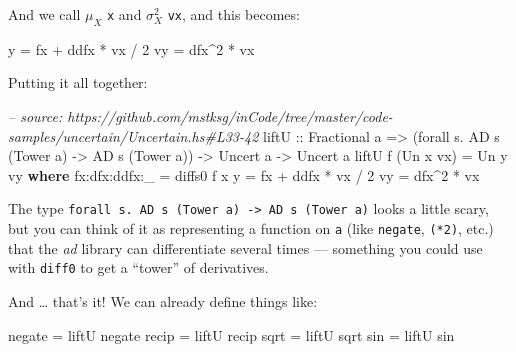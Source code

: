 \documentclass[]{article}
\newenvironment{Shaded}{}{}
\newcommand{\KeywordTok}[1]{\textcolor[rgb]{0.00,0.44,0.13}{\textbf{{#1}}}}
\newcommand{\DataTypeTok}[1]{\textcolor[rgb]{0.56,0.13,0.00}{{#1}}}
\newcommand{\DecValTok}[1]{\textcolor[rgb]{0.25,0.63,0.44}{{#1}}}
\newcommand{\CommentTok}[1]{\textcolor[rgb]{0.38,0.63,0.69}{\textit{{#1}}}}
\newcommand{\OtherTok}[1]{\textcolor[rgb]{0.00,0.44,0.13}{{#1}}}
\newcommand{\FunctionTok}[1]{\textcolor[rgb]{0.02,0.16,0.49}{{#1}}}
\newcommand{\NormalTok}[1]{{#1}}
\begin{document}
And we call \(\mu_X\) \texttt{x} and \(\sigma_X^2\) \texttt{vx}, and
this becomes:

\begin{Shaded}
\begin{Highlighting}[]
\NormalTok{y  }\FunctionTok{=} \NormalTok{fx }\FunctionTok{+} \NormalTok{ddfx }\FunctionTok{*} \NormalTok{vx }\FunctionTok{/} \DecValTok{2}
\NormalTok{vy }\FunctionTok{=} \NormalTok{dfx}\FunctionTok{^}\DecValTok{2} \FunctionTok{*} \NormalTok{vx}
\end{Highlighting}
\end{Shaded}

Putting it all together:

\begin{Shaded}
\begin{Highlighting}[]
\CommentTok{-- source: https://github.com/mstksg/inCode/tree/master/code-samples/uncertain/Uncertain.hs#L33-42}
\NormalTok{liftU}
\OtherTok{    ::} \DataTypeTok{Fractional} \NormalTok{a}
    \OtherTok{=>} \NormalTok{(forall s}\FunctionTok{.} \DataTypeTok{AD} \NormalTok{s (}\DataTypeTok{Tower} \NormalTok{a) }\OtherTok{->} \DataTypeTok{AD} \NormalTok{s (}\DataTypeTok{Tower} \NormalTok{a))}
    \OtherTok{->} \DataTypeTok{Uncert} \NormalTok{a}
    \OtherTok{->} \DataTypeTok{Uncert} \NormalTok{a}
\NormalTok{liftU f (}\DataTypeTok{Un} \NormalTok{x vx) }\FunctionTok{=} \DataTypeTok{Un} \NormalTok{y vy}
  \KeywordTok{where}
    \NormalTok{fx}\FunctionTok{:}\NormalTok{dfx}\FunctionTok{:}\NormalTok{ddfx}\FunctionTok{:}\NormalTok{_ }\FunctionTok{=} \NormalTok{diffs0 f x}
    \NormalTok{y             }\FunctionTok{=} \NormalTok{fx }\FunctionTok{+} \NormalTok{ddfx }\FunctionTok{*} \NormalTok{vx }\FunctionTok{/} \DecValTok{2}
    \NormalTok{vy            }\FunctionTok{=} \NormalTok{dfx}\FunctionTok{^}\DecValTok{2} \FunctionTok{*} \NormalTok{vx}
\end{Highlighting}
\end{Shaded}

The type
\texttt{forall\ s.\ AD\ s\ (Tower\ a)\ -\textgreater{}\ AD\ s\ (Tower\ a)}
looks a little scary, but you can think of it as representing a function
on \texttt{a} (like \texttt{negate}, \texttt{(*2)}, etc.) that the
\emph{ad} library can differentiate several times --- something you
could use with \texttt{diff0} to get a ``tower'' of derivatives.

And \ldots{} that's it! We can already define things like:

\begin{Shaded}
\begin{Highlighting}[]
\NormalTok{negate }\FunctionTok{=} \NormalTok{liftU negate}
\NormalTok{recip  }\FunctionTok{=} \NormalTok{liftU recip}
\NormalTok{sqrt   }\FunctionTok{=} \NormalTok{liftU sqrt}
\NormalTok{sin    }\FunctionTok{=} \NormalTok{liftU sin}
\end{Highlighting}
\end{Shaded}
\end{document}

